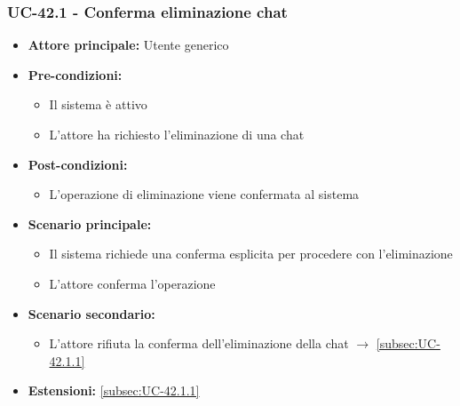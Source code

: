 \documentclass[a4paper,12pt]{article}
\begin{document}
\subsubsection{UC-42.1 - Conferma eliminazione chat} \label{subsec:UC-42.1}
\begin{itemize}
    \item \textbf{Attore principale:} Utente generico
    \item \textbf{Pre-condizioni:}
    \begin{itemize}
        \item Il sistema è attivo
        \item L'attore ha richiesto l'eliminazione di una chat
    \end{itemize}
    \item \textbf{Post-condizioni:} 
    \begin{itemize}
        \item L'operazione di eliminazione viene confermata al sistema
    \end{itemize}
    \item \textbf{Scenario principale:} 
    \begin{itemize}
        \item Il sistema richiede una conferma esplicita per procedere con l'eliminazione
        \item L'attore conferma l'operazione
    \end{itemize}
    \item \textbf{Scenario secondario:}
    \begin{itemize}
        \item L'attore rifiuta la conferma dell'eliminazione della chat $\rightarrow$ \ref{subsec:UC-42.1.1}
    \end{itemize}
    \item \textbf{Estensioni:} \ref{subsec:UC-42.1.1}
\end{itemize}
\end{document}
